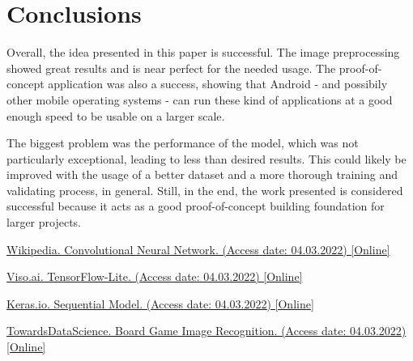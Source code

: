 \documentclass[10pt]{article}
\begin{document}
\pagebreak

\section{Conclusions}\label{sec:5}

Overall, the idea presented in this paper is successful. The image preprocessing showed great results and is near perfect for the needed usage. The proof-of-concept application was also a success, showing that Android - and possibily other mobile operating systems - can run these kind of applications at a good enough speed to be usable on a larger scale.

The biggest problem was the performance of the model, which was not particularly exceptional, leading to less than desired results. This could likely be improved with the usage of a better dataset and a more thorough training and validating process, in general. Still, in the end, the work presented is considered successful because it acts as a good proof-of-concept building foundation for larger projects.

\newpage

\begin{thebibliography}{9}
	\href{https://en.wikipedia.org/wiki/Convolutional_neural_network}{Wikipedia. Convolutional Neural Network. (Access date: 04.03.2022) [Online]}
	
	\href{https://viso.ai/edge-ai/tensorflow-lite/}{Viso.ai. TensorFlow-Lite. (Access date: 04.03.2022) [Online]}
	
	\href{https://keras.io/guides/sequential_model/}{Keras.io. Sequential Model. (Access date: 04.03.2022) [Online]}
	
	\href{https://towardsdatascience.com/board-game-image-recognition-using-neural-networks-116fc876dafa}{TowardsDataScience. Board Game Image Recognition. (Access date: 04.03.2022) [Online]}
	
	
\end{thebibliography}
\end{document}
